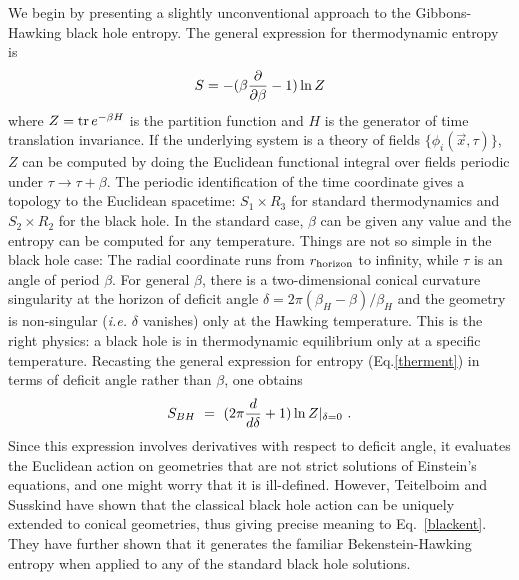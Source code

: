 \documentclass[12pt]{article}
\begin{document}
We begin by presenting a slightly unconventional approach to the
Gibbons-Hawking
black hole entropy. The general expression for thermodynamic entropy is
\begin{equation}
S = -(\beta {\partial \over \partial \beta} -1 ) \ln Z
\label{therment}
\end{equation}
where $Z= \mathop{\rm tr} e^{-\beta H}$ is the partition function and $H$ is the
generator of time translation invariance. If the underlying
system is a theory of fields $\{\phi_i(\vec x,\tau)\}$, $Z$ can be
computed by doing the Euclidean functional integral over fields
periodic under $\tau\to\tau+\beta$. The periodic identification of the time
coordinate gives a topology to the Euclidean spacetime: $S_1\times R_3$ for
standard thermodynamics and $S_2\times R_2$ for the black hole. In the standard
case, $\beta$ can be given any value and the entropy can be computed for
any temperature. Things are not so simple in the black hole case: The radial
coordinate runs from $r_{\rm horizon}$ to infinity, while $\tau$ is an angle
of period $\beta$. For general $\beta$, there is a two-dimensional conical
curvature singularity at the horizon of deficit angle $\delta= 2\pi
(\beta_H-\beta)/\beta_H$
and the geometry is non-singular ({\it i.e.} $\delta$ vanishes)
only at the Hawking temperature. This is the right physics: a black hole is in
thermodynamic equilibrium only at a specific temperature. Recasting the
general expression for entropy (Eq.\ref{therment}) in terms of deficit angle
rather than $\beta$, one obtains
\begin{equation}
S_{BH}~=~ (2\pi{d \over d \delta} +1 ) \ln Z |_{\delta=0}~.
\label{blackent}
\end{equation}
Since this expression involves derivatives with respect to deficit angle, it
evaluates the Euclidean action on geometries that are not strict solutions of
Einstein's equations, and one might worry that it is ill-defined. However,
Teitelboim\cite{claudio} and Susskind\cite{lenny} have shown that the classical
black hole action can be uniquely extended to conical geometries, thus giving
precise
meaning to Eq.~\ref{blackent}. They have further shown that it generates
  the familiar Bekenstein-Hawking entropy when applied to any of the standard
black hole solutions.
\end{document}
